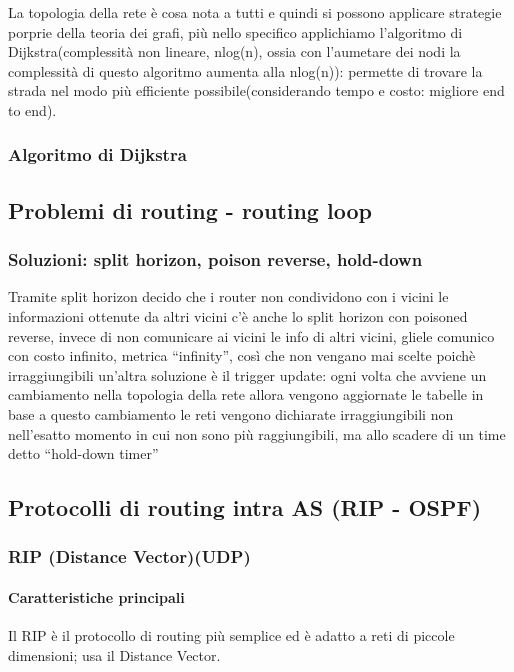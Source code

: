 La topologia della rete è cosa nota a tutti e quindi si possono applicare strategie porprie della teoria dei grafi, più nello specifico applichiamo l'algoritmo di Dijkstra(complessità non lineare, nlog(n), ossia con l'aumetare dei nodi la complessità di questo algoritmo aumenta alla nlog(n)):
permette di trovare la strada nel modo più efficiente possibile(considerando tempo e costo: migliore end to end).


\subsubsection{Algoritmo di Dijkstra}



\subsection{Problemi di routing - routing loop}

\subsubsection{Soluzioni: split horizon, poison reverse, hold-down}
Tramite split horizon decido che i router non condividono con i vicini le informazioni ottenute da altri vicini
c'è anche lo split horizon con poisoned reverse, invece di non comunicare ai vicini le info di altri vicini, gliele comunico con costo infinito, metrica “infinity”, così che non vengano mai scelte poichè irraggiungibili
un'altra soluzione è il trigger update: ogni volta che avviene un cambiamento nella topologia della rete allora vengono aggiornate le tabelle in base a questo cambiamento 
le reti vengono dichiarate irraggiungibili non nell'esatto momento in cui non sono più raggiungibili, ma allo scadere di un time detto “hold-down timer” 

\newpage
\subsection{Protocolli di routing intra AS (RIP - OSPF)}
\subsubsection{RIP (Distance Vector)(UDP)}
\paragraph{Caratteristiche principali}
Il RIP è il protocollo di routing più semplice ed è adatto a reti di piccole dimensioni; usa il Distance Vector.

